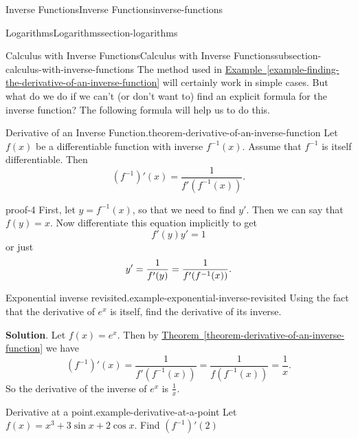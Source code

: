 \documentclass[oneside,10pt,]{book}
\renewcommand{\qedhere}{\relax}
\numberwithin{equation}{section}
\begin{document}
\begin{chapterptx}{Inverse Functions}{}{Inverse Functions}{}{}{inverse-functions}
\begin{sectionptx}{Logarithms}{}{Logarithms}{}{}{section-logarithms}
\begin{subsectionptx}{Calculus with Inverse Functions}{}{Calculus with Inverse Functions}{}{}{subsection-calculus-with-inverse-functions}
\hypertarget{p-210}{}%
The method used in \hyperref[example-finding-the-derivative-of-an-inverse-function]{Example~\ref{example-finding-the-derivative-of-an-inverse-function}} will certainly work in simple cases. But what do we do if we can't (or don't want to) find an explicit formula for the inverse function? The following formula will help us to do this.%
\begin{theorem}{Derivative of an Inverse Function.}{}{theorem-derivative-of-an-inverse-function}%
\hypertarget{p-211}{}%
Let \(f(x)\) be a differentiable function with inverse \(f^{-1}(x)\). Assume that \(f^{-1}\) is itself differentiable. Then%
\begin{equation*}
(f^{-1})'(x) = \frac{1}{f'(f^{-1}(x))}.
\end{equation*}
%
\end{theorem}
\begin{proofptx}{}{proof-4}
\hypertarget{p-212}{}%
First, let \(y = f^{-1}(x)\), so that we need to find \(y'\). Then we can say that \(f(y) = x\). Now differentiate this equation implicitly to get%
\begin{equation*}
f'(y)y' = 1
\end{equation*}
or just%
\begin{equation*}
y' = \frac{1}{f'(y)} = \frac{1}{f'(f^{-1}(x))}.\qedhere
\end{equation*}
%
\end{proofptx}
\begin{example}{Exponential inverse revisited.}{example-exponential-inverse-revisited}%
\hypertarget{p-213}{}%
Using the fact that the derivative of \(e^{x}\) is itself, find the derivative of its inverse.%
\par\smallskip%
\noindent\textbf{Solution}.\hypertarget{solution-46}{}\quad%
\hypertarget{p-214}{}%
Let \(f(x) = e^{x}\). Then by \hyperref[theorem-derivative-of-an-inverse-function]{Theorem~\ref{theorem-derivative-of-an-inverse-function}} we have%
\begin{equation*}
(f^{-1})'(x) = \frac{1}{f'(f^{-1}(x))} = \frac{1}{f(f^{-1}(x))} = \frac{1}{x}.
\end{equation*}
So the derivative of the inverse of \(e^{x}\) is \(\frac{1}{x}\).%
\end{example}
\begin{example}{Derivative at a point.}{example-derivative-at-a-point}%
\hypertarget{p-215}{}%
Let \(f(x) = x^{3} + 3\sin x + 2\cos x\). Find \((f^{-1})'(2)\)%
\par\smallskip%

\end{example}
\end{subsectionptx}
\end{sectionptx}
\end{chapterptx}
\end{document}
